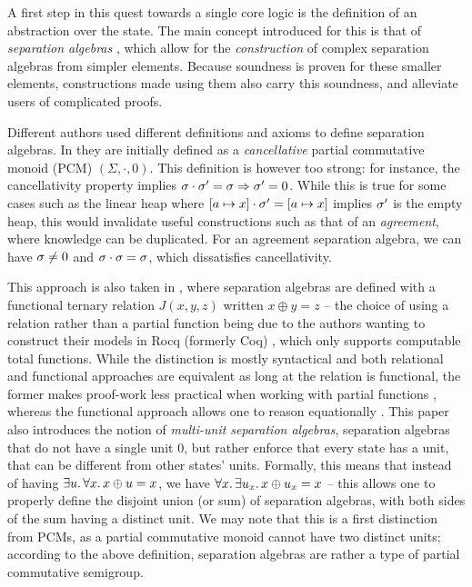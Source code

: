 A first step in this quest towards a single core logic is the definition of an abstraction over the state. The main concept introduced for this is that of \emph{separation algebras} \cite{abstractseplogic, sepalgebra}, which allow for the \emph{construction} of complex separation algebras from simpler elements. Because soundness is proven for these smaller elements, constructions made using them also carry this soundness, and alleviate users of complicated proofs.

Different authors used different definitions and axioms to define separation algebras. In \cite{abstractseplogic} they are initially defined as a \emph{cancellative} partial commutative monoid (PCM) $(\Sigma, \cdot, 0)$. This definition is however too strong: for instance, the cancellativity property implies $\sigma\cdot\sigma'=\sigma \Rightarrow \sigma'=0$. While this is true for some cases such as the linear heap where $[a\mapsto x]\cdot \sigma'=[a\mapsto x]$ implies $\sigma'$ is the empty heap, this would invalidate useful constructions such as that of an \emph{agreement}, where knowledge can be duplicated. For an agreement separation algebra, we can have $\sigma\neq 0$ and $\sigma \cdot \sigma = \sigma$, which dissatisfies cancellativity.

This approach is also taken in \cite{sepalgebra}, where separation algebras are defined with a functional ternary relation $J(x,y,z)$ written $x\oplus y=z$ -- the choice of using a relation rather than a partial function being due to the authors wanting to construct their models in Rocq (formerly Coq) \cite{coq}, which only supports computable total functions. While the distinction is mostly syntactical and both relational and functional approaches are equivalent as long at the relation is functional, the former makes proof-work less practical when working with partial functions \cite{statesoundness}, whereas the functional approach allows one to reason equationally \cite{iris}. This paper also introduces the notion of \emph{multi-unit separation algebras}, separation algebras that do not have a single unit $0$, but rather enforce that every state has a unit, that can be different from other states' units. Formally, this means that instead of having $\exists u\ldotp \forall x\ldotp x \oplus u = x$, we have $\forall x\ldotp\exists u_x\ldotp x\oplus u_x=x$ -- this allows one to properly define the disjoint union (or sum) of separation algebras, with both sides of the sum having a distinct unit. We may note that this is a first distinction from PCMs, as a partial commutative monoid cannot have two distinct units; according to the above definition, separation algebras are rather a type of partial commutative semigroup.

